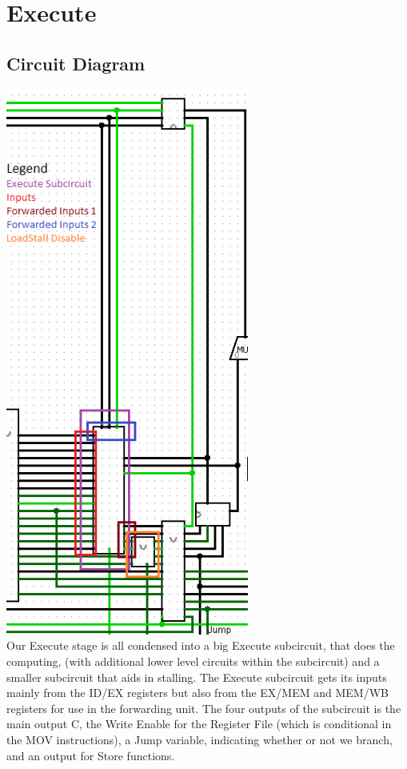 \documentclass{article}
\begin{document}
\section{Execute}
\subsection{Circuit Diagram}
\includegraphics[width=8cm]{ALU.png}
\\
Our Execute stage is all condensed into a big Execute subcircuit, that does the computing, (with additional lower level circuits within the subcircuit) and a smaller subcircuit that aids in stalling. The Execute subcircuit gets its inputs mainly from the ID/EX registers but also from the EX/MEM and MEM/WB registers for use in the forwarding unit. The four outputs of the subcircuit is the main output C, the Write Enable for the Register File (which is conditional in the MOV instructions), a Jump variable, indicating whether or not we branch, and an output for Store functions. 
\end{document}

